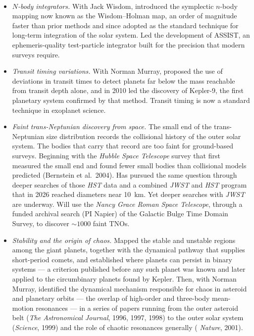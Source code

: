 \documentclass[11pt,letterpaper]{article}
\newcommand{\sect}[1]{\vspace{0.14in}\noindent{\bf #1}\vspace{0.06in}\\}
\begin{document}
\sect{Principal Research Contributions}
\noindent
{\small
\begin{itemize}\itemsep2pt \parskip0pt
\item {\it $N$-body integrators.} With Jack Wisdom, introduced the symplectic
$n$-body mapping now known as the Wisdom--Holman map, an order of magnitude
faster than prior methods and since adopted as the standard technique for
long-term integration of the solar system.  Led the
development of ASSIST, an ephemeris-quality test-particle integrator built for
the precision that modern surveys require.

\item {\it Transit timing variations.} With Norman Murray, proposed the use of
deviations in transit times to detect planets far below the mass reachable from
transit depth alone, and in 2010 led the discovery of Kepler-9, the first
planetary system confirmed by that method.  Transit timing is now a standard
technique in exoplanet science.

\item {\it Faint trans-Neptunian discovery from space.} The small end of the
trans-Neptunian size distribution records the collisional history of the outer
solar system.  The bodies that carry that record are too faint for
ground-based surveys.  Beginning with the {\it Hubble Space Telescope} survey
that first measured the small end and found fewer small bodies than collisional
models predicted (Bernstein et al.\ 2004).  Has pursued the same question through
deeper searches of those {\it HST} data and a combined {\it JWST} and {\it HST} program that in 2026
reached diameters near 10~km.  Yet deeper searches with {\it JWST} are underway.  Will use the {\it Nancy Grace Roman Space Telescope}, through a funded archival search (PI Napier) of the
Galactic Bulge Time Domain Survey, to discover $\sim1000$ faint TNOs.

\item {\it Stability and the origin of chaos.} Mapped the stable and unstable
regions among the giant planets, together with the dynamical pathway that
supplies short-period comets, and established where planets can persist in
binary systems --- a criterion published before any such planet was known and
later applied to the circumbinary planets found by Kepler.  Then, with Norman
Murray, identified the dynamical mechanism responsible for chaos in asteroid and
planetary orbits --- the overlap of high-order and three-body mean-motion
resonances --- in a series of papers running from the outer asteroid belt
({\it The Astronomical Journal}, 1996, 1997, 1998) to the outer solar system
({\it Science}, 1999) and the role of chaotic resonances generally ({\it
Nature}, 2001).%


\end{itemize}}
\end{document}

